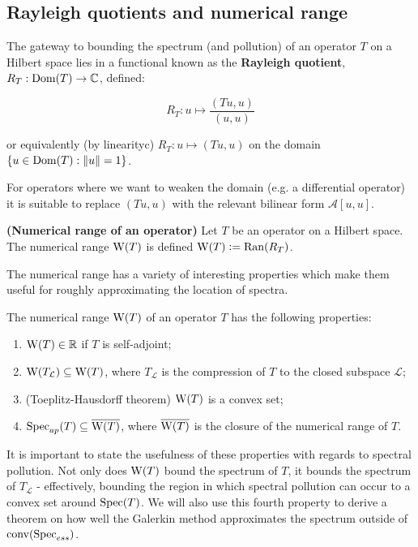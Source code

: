 \documentclass[../main.tex]{subfiles}
\begin{document}
\subsection{Rayleigh quotients and numerical range}
The gateway to bounding the spectrum (and pollution) of an operator $T$ on a Hilbert space lies in a functional known as the \textbf{Rayleigh quotient}, $R_T: \mathrm{Dom}(T) \rightarrow \mathbb{C}$, defined:

 \begin{equation*}
 R_T: u \mapsto \frac{( Tu, u )}{(u, u)}
 \end{equation*}
 
 or equivalently (by linearityc) $R_T: u \mapsto (Tu, u)$ on the domain $\{u \in \mathrm{Dom}(T) : \|u\| = 1\}$.
 
 For operators where we want to weaken the domain (e.g. a differential operator) it is suitable to replace $(Tu, u)$ with the relevant bilinear form $\mathcal{A}[u, u].$

\begin{definition}{\textbf{(Numerical range of an operator)}} Let $T$ be an operator on a Hilbert space. The
numerical range $\mathrm{W}(T)$ is defined $\mathrm{W}(T) \mathrel{\mathop:}= \mathrm{Ran}(R_T)$.
\end{definition}

The numerical range has a variety of interesting properties which make them useful for roughly approximating
the location of spectra.

\begin{proposition}\label{thm:num-range-props}
The numerical range $\mathrm{W}(T)$ of an operator $T$ has the following properties:
\begin{enumerate}
\item\label{item:num-in-R} $\mathrm{W}(T) \in \mathbb{R}$ if $T$ is self-adjoint;
\item\label{item:proj-num-range} $\mathrm{W}(T_\mathcal{L}) \subseteq \mathrm{W}(T)$, where $T_\mathcal{L}$ is the compression of $T$ to the closed subspace $\mathcal{L}$;
\item (Toeplitz-Hausdorff theorem)\label{item:toeplitz-hausdorff} $\mathrm{W}(T)$ is a convex set;
\item\label{item:spec-in-num} $\mathrm{Spec}_{ap}(T) \subseteq \overline{\mathrm{W}(T)}$, where $\overline{\mathrm{W}(T)}$ is the closure of the numerical range of $T$.
\end{enumerate}
\end{proposition}

It is important to state the usefulness of these properties with regards to spectral pollution. Not only does $\mathrm{W}(T)$ bound the spectrum of $T$,
it bounds the spectrum of $T_\mathcal{L}$ - effectively, bounding the region in which spectral pollution can occur to a convex set around $\mathrm{Spec}(T)$.
We will also use this fourth property to derive a theorem on how well the Galerkin method approximates the spectrum outside of $\mathrm{conv}(\mathrm{Spec}_{ess})$.
\end{document}
